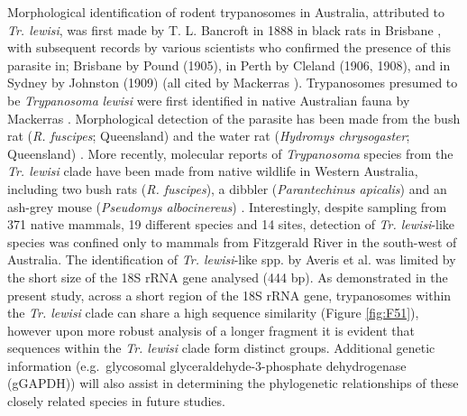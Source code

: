 \documentclass[a4paper, nobind]{templates/ociamthesis}
\begin{document}
Morphological identification of rodent trypanosomes in Australia, attributed to \emph{Tr. lewisi}, was first made by T. L. Bancroft in 1888 in black rats in Brisbane \autocite{mackerrasHaematozoaAustralianMammals1959}, with subsequent records by various scientists who confirmed the presence of this parasite in; Brisbane by Pound (1905), in Perth by Cleland (1906, 1908), and in Sydney by Johnston (1909) (all cited by Mackerras \autocite*{mackerrasHaematozoaAustralianMammals1959}). Trypanosomes presumed to be \emph{Trypanosoma} \emph{lewisi} were first identified in native Australian fauna by Mackerras \autocite*{mackerrasCatalogueAustralianMammals1958a}. Morphological detection of the parasite has been made from the bush rat (\emph{R. fuscipes}; Queensland) and the water rat (\emph{Hydromys chrysogaster}; Queensland) \autocite{mackerrasHaematozoaAustralianMammals1959,mackerrasCatalogueAustralianMammals1958a}. More recently, molecular reports of \emph{Trypanosoma} species from the \emph{Tr. lewisi} clade have been made from native wildlife in Western Australia, including two bush rats (\emph{R. fuscipes}), a dibbler (\emph{Parantechinus apicalis}) and an ash-grey mouse (\emph{Pseudomys albocinereus}) \autocite{averisDiversityDistributionHostparasite2009}. Interestingly, despite sampling from 371 native mammals, 19 different species and 14 sites, detection of \emph{Tr. lewisi}-like species was confined only to mammals from Fitzgerald River in the south-west of Australia. The identification of \emph{Tr. lewisi}-like spp. by Averis et al. \autocite*{averisDiversityDistributionHostparasite2009} was limited by the short size of the 18S rRNA gene analysed (444 bp). As demonstrated in the present study, across a short region of the 18S rRNA gene, trypanosomes within the \emph{Tr. lewisi} clade can share a high sequence similarity (Figure \ref{fig:F51}), however upon more robust analysis of a longer fragment it is evident that sequences within the \emph{Tr. lewisi} clade form distinct groups. Additional genetic information (e.g.~glycosomal glyceraldehyde-3-phosphate dehydrogenase (gGAPDH)) will also assist in determining the phylogenetic relationships of these closely related species in future studies.
\end{document}
